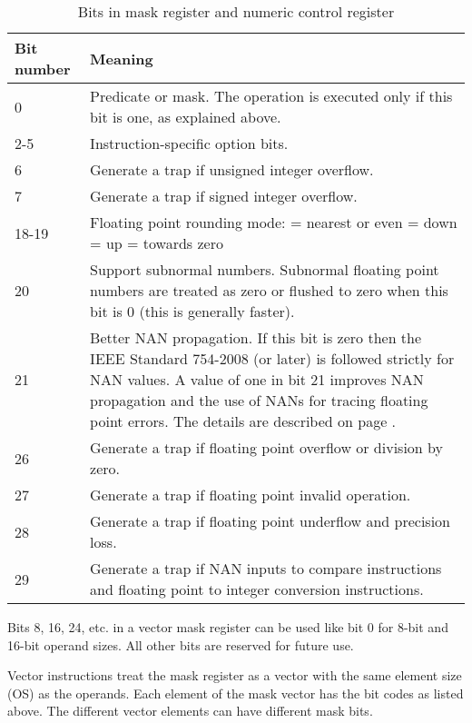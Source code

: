\documentclass[forwardcom.tex]{subfiles}
\begin{document}
\begin{longtable}
{|p{15mm}|p{90mm}|}
\caption{Bits in mask register and numeric control register}
\label{table:maskBits}
\endfirsthead
\endhead
\hline
\bfseries Bit number & \bfseries Meaning \\
 \hline
0 & Predicate or mask. The operation is executed only if this bit is one, as explained above.\\
\hline
2-5 & Instruction-specific option bits.\\
\hline
6 & Generate a trap if unsigned integer overflow. \\
\hline
7 & Generate a trap if signed integer overflow. \\

\hline
18-19 & Floating point rounding mode: \newline
00 = nearest or even \newline
01 = down \newline
10 = up \newline
11 = towards zero \\
\hline
20 & Support subnormal numbers. Subnormal floating point numbers are treated as zero or flushed to zero when this bit is 0 (this is generally faster). \\
\hline
21 & Better NAN propagation. If this bit is zero then the IEEE Standard 754-2008 (or later) is followed strictly for NAN values. A value of one in bit 21 improves NAN propagation and the use of NANs for tracing floating point errors. The details are described on page \pageref{nanPropagation}. \\
\hline
26 & Generate a trap if floating point overflow or division by zero.  \\
\hline
27 & Generate a trap if floating point invalid operation. \\
\hline
28 & Generate a trap if floating point underflow and precision loss. \\
\hline
29 & Generate a trap if NAN inputs to compare instructions and floating point to integer conversion instructions.\\
\hline
\end{longtable}

Bits 8, 16, 24, etc. in a vector mask register can be used like bit 0 for 8-bit and 16-bit operand sizes. All other bits are reserved for future use.
\vspace{2mm}

Vector instructions treat the mask register as a vector with the same element size (OS) as the operands. Each element of the mask vector has the bit codes as listed above. The different vector elements can have different mask bits.
\vspace{2mm}
\end{document}
